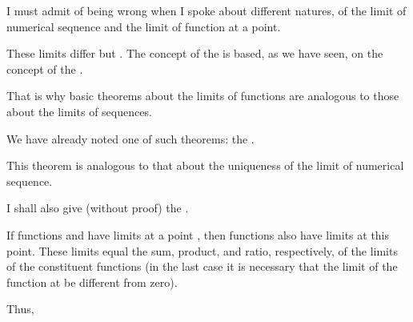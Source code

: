 \begin{s}
I must admit of being wrong when I spoke about different natures, of the limit of numerical sequence and the limit of function at a point.
\end{s}

\begin{p}
These limits differ but . The concept of the  is based, as we have seen, on the concept of the .

That is why basic theorems about the limits of functions are analogous to those about the limits of sequences.
\end{p}

\begin{s}
We have already noted one of such theorems: the .
\end{s}


\begin{p}
This theorem is analogous to that about the uniqueness of the limit of numerical sequence.

I shall also give (without proof) the . 

\begin{thm}
If functions  and  have limits at a point , then functions
also have limits at this point. These limits equal the sum, product, and ratio, respectively, of the limits of the constituent functions (in the last case it is necessary that the limit of the function  at  be different from zero).
\end{thm}
Thus,
\end{p}

